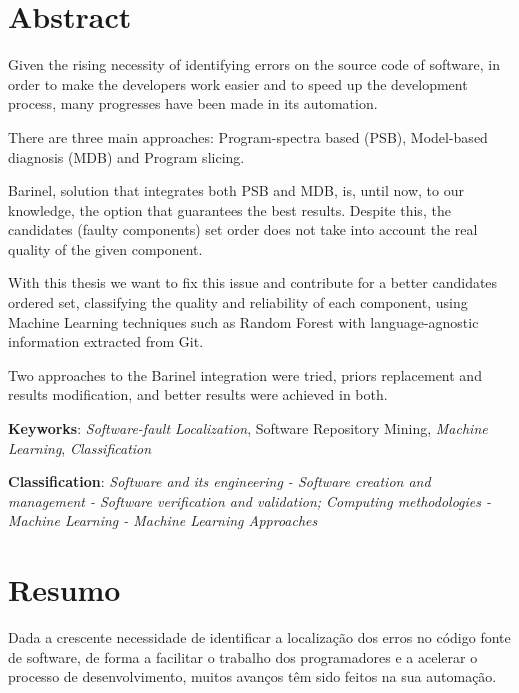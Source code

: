 \chapter*{Abstract}

Given the rising necessity of identifying errors on the source code of software, in order to make the developers work easier and to speed up the development process, many progresses have been made in its automation. 

There are three main approaches: Program-spectra based (PSB), Model-based diagnosis (MDB) and Program slicing. 

Barinel, solution that integrates both PSB and MDB, is, until now, to our knowledge, the option that guarantees the best results. Despite this, the candidates (faulty components) set order does not take into account the real quality of the given component. 

With this thesis we want to fix this issue and contribute for a better candidates ordered set, classifying the quality and reliability of each component, using Machine Learning techniques such as  Random Forest with language-agnostic information extracted from Git.

Two approaches to the Barinel integration were tried, priors replacement and results modification, and better results were achieved in both.

\vspace*{10mm}\noindent

\textbf{Keyworks}: \emph{Software-fault Localization}, Software Repository Mining, \emph{Machine Learning}, \emph{Classification}

\vspace*{5mm}\noindent

\textbf{Classification}: \emph{Software and its engineering - Software creation and management - Software verification and validation; Computing methodologies - Machine Learning - Machine Learning Approaches}

\chapter*{Resumo}

Dada a crescente necessidade de identificar a localização dos erros no código fonte de software, de forma a facilitar o trabalho dos programadores e a acelerar o processo de desenvolvimento, muitos avanços têm sido feitos na sua automação.

